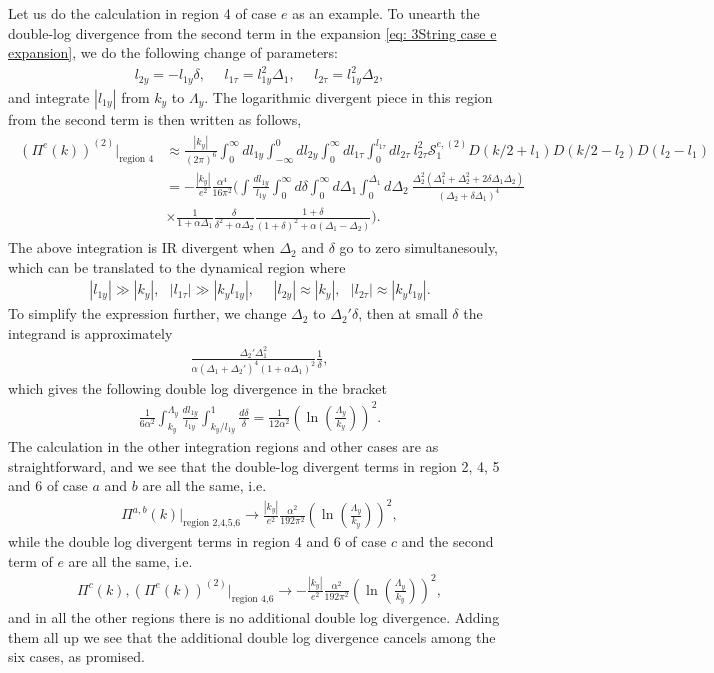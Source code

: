 \documentclass[prx,amsmath,amssymb, notitlepage, onecolumn,
nofootinbib,
superscriptaddress,
longbibliography
]{revtex4-1}
\newcommand{\mc}[1]{\mathcal{#1}}
\newcommand{\beq}{\begin{eqnarray}}
\newcommand{\eeq}{\end{eqnarray}}
\begin{document}
Let us do the calculation in region 4 of case $e$ as an example. 
To unearth the double-log divergence from the second term in the expansion \eqref{eq: 3String case e expansion}, we do the following change of parameters:
\beq
l_{2y}=-l_{1y}\delta,~~~~~~l_{1\tau} = l_{1y}^2\Delta_1,~~~~~~l_{2\tau} = l_{1y}^2\Delta_2,
\eeq
and integrate $|l_{1y}|$ from $k_y$ to $\Lambda_y$. The logarithmic divergent piece in this region from the second term is then written as follows,
\beq\label{eq: 3Sstring pre log example}
\begin{split}
\left(\Pi^{e}(k)\right)^{(2)}\Bigg|_{\text{region~4}} &\approx \frac{|k_y|}{(2\pi)^6}\int_0^\infty dl_{1y} \int_{-\infty}^0 d l_{2y} \int_0^\infty d l_{1\tau} \int _0^{l_{1\tau}} d l_{2\tau}~l_{2\tau}^2 \mc{S}_1^{e, (2)}D(k/2+l_1)D(k/2-l_2)D(l_2-l_1)\\ &=-\frac{|k_y|}{e^2}\frac{\alpha^4}{16\pi^2}\Bigg(\int\frac{d l_{1y}}{l_{1y}}\int_0^\infty d\delta\int_0^\infty d\Delta_1 \int_0^{\Delta_1} d\Delta_2~\frac{\Delta_2^2(\Delta_1^2+\Delta_2^2+2\delta\Delta_1\Delta_2)}{(\Delta_2 + \delta \Delta_1)^4}\\
&\times\frac{1}{1+\alpha\Delta_1}\frac{\delta}{\delta^2+\alpha\Delta_2}\frac{1+\delta}{(1+\delta)^2+\alpha(\Delta_1-\Delta_2)}\Bigg).
\end{split}
\eeq
The above integration is IR divergent when $\Delta_2$ and $\delta$ go to zero simultanesouly, which can be translated to the dynamical region where
\beq\label{eq: double log region another}
|l_{1y}|\gg |k_y|,~~~|l_{1\tau}|\gg |k_y l_{1y}|,~~~~~~ |l_{2y}| \approx |k_y|,~~~ |l_{2\tau}|\approx |k_y l_{1y}| .
\eeq
To simplify the expression further, we change $\Delta_2$ to $\Delta_2' \delta$, then at small $\delta$ the integrand is approximately
\beq
\frac{\Delta_2'\Delta_1^2}{\alpha(\Delta_1+\Delta_2')^4(1+\alpha\Delta_1)^2}\frac{1}{\delta},
\eeq
which gives the following double log divergence in the bracket
\beq
\frac{1}{6\alpha^2}\int_{k_y}^{\Lambda_y}\frac{dl_{1y}}{l_{1y}}\int_{k_y/l_{1y}}^1\frac{d\delta}{\delta}=\frac{1}{12\alpha^2}\left(\ln\left(\frac{\Lambda_y}{k_y}\right)\right)^2.
\eeq
The calculation in the other integration regions and other cases are as straightforward, and we see that the double-log divergent terms in region 2, 4, 5 and 6 of case $a$ and $b$ are all the same, i.e.
\beq
\Pi^{a,b}(k)\Bigg|_{\text{region~2,4,5,6}}\rightarrow\frac{|k_y|}{e^2}\frac{\alpha^2}{192\pi^2}\left(\ln\left(\frac{\Lambda_y}{k_y}\right)\right)^2,
\eeq
while the double log divergent terms in region 4 and 6 of case $c$ and the second term of $e$ are all the same, i.e.
\beq
\Pi^{c}(k), (\Pi^{e}(k))^{(2)}\Bigg|_{\text{region~4,6}}\rightarrow-\frac{|k_y|}{e^2}\frac{\alpha^2}{192\pi^2}\left(\ln\left(\frac{\Lambda_y}{k_y}\right)\right)^2,
\eeq
and in all the other regions there is no additional double log divergence. Adding them all up we see that the additional double log divergence cancels among the six cases, as promised.
\end{document}
